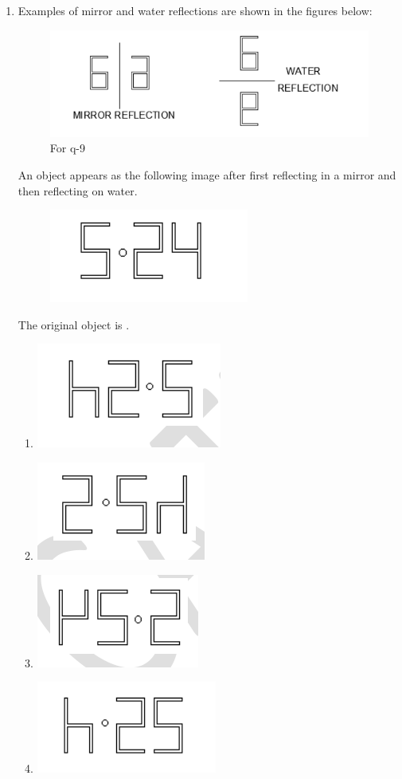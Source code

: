 \documentclass[journal,12pt,onecolumn]{IEEEtran}
\theoremstyle{remark}
\begin{document}
\begin{enumerate}
\item Examples of mirror and water reflections are shown in the figures below:
\begin{figure}[H]
    \centering
    \includegraphics[width=0.7\columnwidth]{q91.png}
    \caption{For q-9}
    \label{fig:q9}
\end{figure}
An object appears as the following image after first reflecting in a mirror and then reflecting on water.
\begin{figure}[H]
    \centering
    \includegraphics[width=0.3\columnwidth]{q92.png}
    \caption*{}
    \label{fig:q9}
\end{figure}
The original object is \underline{\hspace{2cm}}.
\hfill{}
\begin{multicols}{2}
\begin{enumerate}
    \item \includegraphics[width=0.3\columnwidth]{q9a.png}
    \item \includegraphics[width=0.3\columnwidth]{q9b.png}
    \item \includegraphics[width=0.3\columnwidth]{q9c.png}
    \item \includegraphics[width=0.3\columnwidth]{q9d.png}
\end{enumerate}
\end{multicols}


\end{enumerate}
\end{document}
